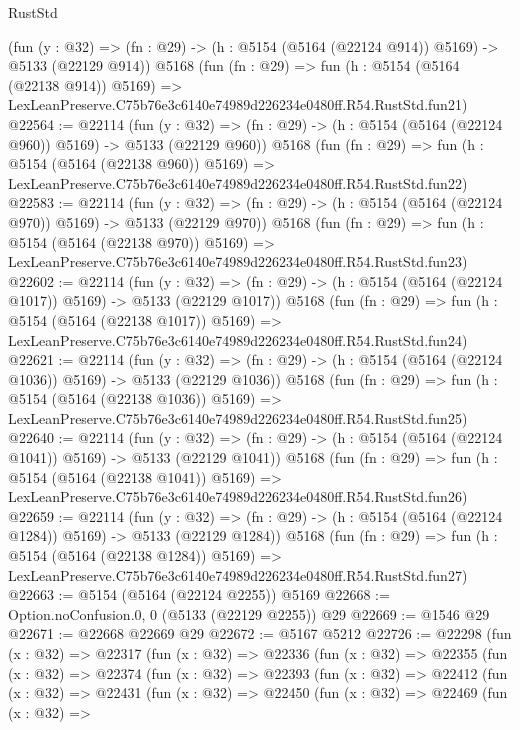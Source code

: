 \begin{lexlean}{RustStd}
\begin{coremodule}
    (fun (y : @32) => (fn : @29) -> (h : @5154 (@5164 (@22124 @914)) @5169) -> @5133 (@22129 @914))
    @5168
    (fun (fn : @29) =>
    fun (h : @5154 (@5164 (@22138 @914)) @5169) =>
    LexLeanPreserve.C75b76e3c6140e74989d226234e0480ff.R54.RustStd.fun21)
@22564 := @22114
    (fun (y : @32) => (fn : @29) -> (h : @5154 (@5164 (@22124 @960)) @5169) -> @5133 (@22129 @960))
    @5168
    (fun (fn : @29) =>
    fun (h : @5154 (@5164 (@22138 @960)) @5169) =>
    LexLeanPreserve.C75b76e3c6140e74989d226234e0480ff.R54.RustStd.fun22)
@22583 := @22114
    (fun (y : @32) => (fn : @29) -> (h : @5154 (@5164 (@22124 @970)) @5169) -> @5133 (@22129 @970))
    @5168
    (fun (fn : @29) =>
    fun (h : @5154 (@5164 (@22138 @970)) @5169) =>
    LexLeanPreserve.C75b76e3c6140e74989d226234e0480ff.R54.RustStd.fun23)
@22602 := @22114
    (fun (y : @32) =>
    (fn : @29) -> (h : @5154 (@5164 (@22124 @1017)) @5169) -> @5133 (@22129 @1017))
    @5168
    (fun (fn : @29) =>
    fun (h : @5154 (@5164 (@22138 @1017)) @5169) =>
    LexLeanPreserve.C75b76e3c6140e74989d226234e0480ff.R54.RustStd.fun24)
@22621 := @22114
    (fun (y : @32) =>
    (fn : @29) -> (h : @5154 (@5164 (@22124 @1036)) @5169) -> @5133 (@22129 @1036))
    @5168
    (fun (fn : @29) =>
    fun (h : @5154 (@5164 (@22138 @1036)) @5169) =>
    LexLeanPreserve.C75b76e3c6140e74989d226234e0480ff.R54.RustStd.fun25)
@22640 := @22114
    (fun (y : @32) =>
    (fn : @29) -> (h : @5154 (@5164 (@22124 @1041)) @5169) -> @5133 (@22129 @1041))
    @5168
    (fun (fn : @29) =>
    fun (h : @5154 (@5164 (@22138 @1041)) @5169) =>
    LexLeanPreserve.C75b76e3c6140e74989d226234e0480ff.R54.RustStd.fun26)
@22659 := @22114
    (fun (y : @32) =>
    (fn : @29) -> (h : @5154 (@5164 (@22124 @1284)) @5169) -> @5133 (@22129 @1284))
    @5168
    (fun (fn : @29) =>
    fun (h : @5154 (@5164 (@22138 @1284)) @5169) =>
    LexLeanPreserve.C75b76e3c6140e74989d226234e0480ff.R54.RustStd.fun27)
@22663 := @5154 (@5164 (@22124 @2255)) @5169
@22668 := Option.noConfusion.{0, 0} (@5133 (@22129 @2255)) @29
@22669 := @1546 @29
@22671 := @22668 @22669 @29
@22672 := @5167 @5212
@22726 := @22298
    (fun (x : @32) =>
    @22317
      (fun (x : @32) =>
      @22336
        (fun (x : @32) =>
        @22355
          (fun (x : @32) =>
          @22374
            (fun (x : @32) =>
            @22393
              (fun (x : @32) =>
              @22412
                (fun (x : @32) =>
                @22431
                  (fun (x : @32) =>
                  @22450
                    (fun (x : @32) =>
                    @22469
                      (fun (x : @32) =>

\end{coremodule}
\end{lexlean}

